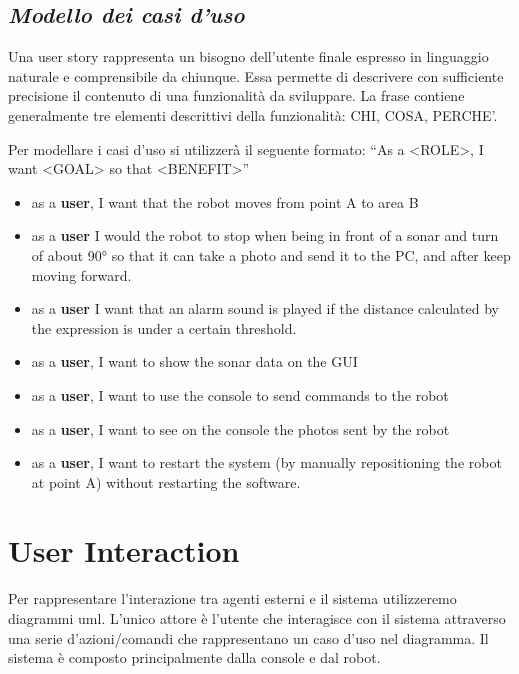 \documentclass[a4paper]{article}
\begin{document}



\subsection {  \textit {Modello dei casi d’uso}}
Una user story rappresenta un bisogno dell’utente finale espresso in linguaggio naturale e comprensibile da chiunque. Essa permette di descrivere con sufficiente precisione il contenuto di una funzionalità da sviluppare. La frase contiene generalmente tre elementi descrittivi della funzionalità: CHI, COSA, PERCHE’.

Per modellare i casi d’uso si utilizzerà il seguente formato:
“As a <ROLE>, I want <GOAL> so that <BENEFIT>”
\begin{itemize}
	\item as a \textbf{user}, I want that the robot moves from point A to area B
	\item as a \textbf{user} I would the robot to stop when being in front of a sonar and turn of about 90° so that it can take a photo and send it to the PC, and after keep moving forward.
	\item as a \textbf{user} I want that an alarm sound is played if the distance calculated by the expression is under a certain threshold.
	\item as a \textbf{user}, I want to show the sonar data on the GUI
	\item as a \textbf{user}, I want to use the console to send commands to the robot
	\item as a \textbf{user}, I want to see on the console the photos sent by the robot
	\item as a \textbf{user}, I want to restart the system (by manually repositioning the robot at point A) without restarting the software.
\end{itemize}

\section{User Interaction}
Per rappresentare l’interazione tra agenti esterni e il sistema utilizzeremo diagrammi uml.
L’unico attore è l’utente che interagisce con il sistema attraverso una serie d’azioni/comandi che rappresentano un caso d’uso nel diagramma. Il sistema è composto principalmente dalla console e dal robot. 
\end{document}
